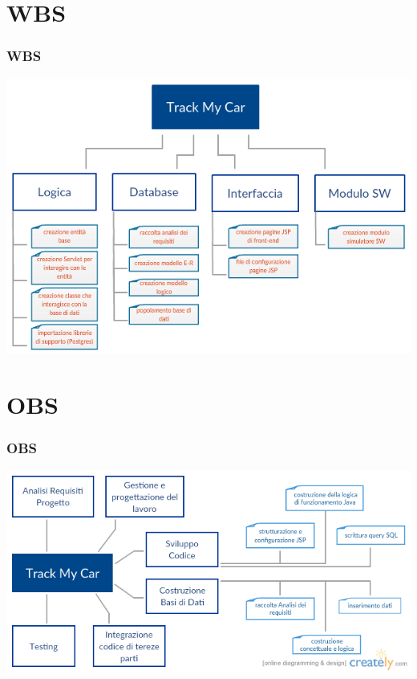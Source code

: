 \documentclass[a4paper,12pt]{beamer}
\begin{document}
\section{WBS}
\begin{frame}
\frametitle{WBS}
\includegraphics[scale=.5]{wbs.png}
\end{frame}

\pagebreak

\section{OBS}
\begin{frame}
\frametitle{OBS}
\includegraphics[scale=.5]{obs.png}
\end{frame}


\pagebreak
\end{document}
